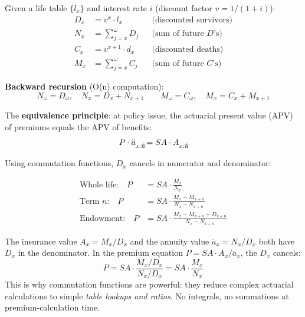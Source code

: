 \documentclass[11pt,a4paper]{article}
\theoremstyle{definition}
\newcommand{\anmark}[1]{\overline{#1}\kern-0.4em\raisebox{0.4ex}{\scriptsize$|$}}
\begin{document}
\begin{formaldef}
Given a life table $\{l_x\}$ and interest rate $i$ (discount factor $v = 1/(1+i)$):
\begin{align}
  D_x &= v^{x} \cdot l_x & &\text{(discounted survivors)} \label{eq:Dx} \\
  N_x &= \sum_{j=x}^{\omega} D_j & &\text{(sum of future $D$'s)} \label{eq:Nx} \\
  C_x &= v^{x+1} \cdot d_x & &\text{(discounted deaths)} \label{eq:Cx} \\
  M_x &= \sum_{j=x}^{\omega} C_j & &\text{(sum of future $C$'s)} \label{eq:Mx}
\end{align}

\textbf{Backward recursion} (O(n) computation):
\begin{equation}
  N_\omega = D_\omega, \quad N_x = D_x + N_{x+1}
  \qquad
  M_\omega = C_\omega, \quad M_x = C_x + M_{x+1}
  \label{eq:backward-recursion}
\end{equation}
\end{formaldef}

\begin{formaldef}
The \textbf{equivalence principle}: at policy issue, the actuarial present
value (APV) of premiums equals the APV of benefits:
\begin{equation}
  P \cdot \ddot{a}_{x:\anmark{n}} = SA \cdot A_{x:\anmark{n}}
  \label{eq:equivalence}
\end{equation}

Using commutation functions, $D_x$ cancels in numerator and denominator:

\begin{align}
  \text{Whole life:} \quad P &= SA \cdot \frac{M_x}{N_x}
  \label{eq:prem-wl} \\[6pt]
  \text{Term $n$:} \quad P &= SA \cdot \frac{M_x - M_{x+n}}{N_x - N_{x+n}}
  \label{eq:prem-term} \\[6pt]
  \text{Endowment:} \quad P &= SA \cdot \frac{M_x - M_{x+n} + D_{x+n}}{N_x - N_{x+n}}
  \label{eq:prem-endow}
\end{align}
\end{formaldef}

\begin{intuition}
The insurance value $A_x = M_x / D_x$ and the annuity value
$\ddot{a}_x = N_x / D_x$ both have $D_x$ in the denominator.
In the premium equation $P = SA \cdot A_x / \ddot{a}_x$, the $D_x$
cancels:
\[
  P = SA \cdot \frac{M_x / D_x}{N_x / D_x} = SA \cdot \frac{M_x}{N_x}
\]
This is why commutation functions are powerful: they reduce complex
actuarial calculations to simple \emph{table lookups and ratios}.
No integrals, no summations at premium-calculation time.
\end{intuition}
\end{document}
